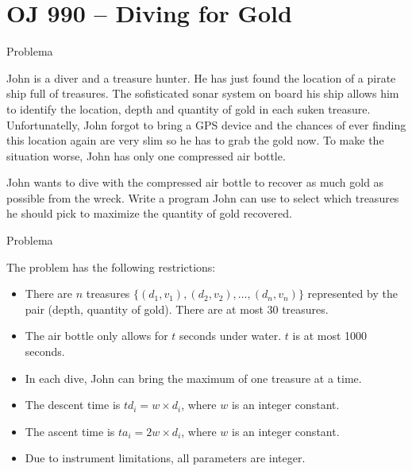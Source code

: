 \section{OJ 990 -- Diving for Gold}

\begin{frame}[fragile]{Problema}

John is a diver and a treasure hunter. He has just found the location of a pirate ship full of 
treasures.  The sofisticated sonar system on board his ship allows him to identify the 
location, depth and quantity of gold in each suken treasure. Unfortunatelly, John forgot to 
bring a GPS device and the chances of ever finding this location again are very slim so he has 
to grab the gold now. To make the situation worse, John has only one compressed air bottle.

John wants to dive with the compressed air bottle to recover as much gold as possible from the
wreck. Write a program John can use to select which treasures he should pick to maximize the 
quantity of gold recovered.

\end{frame}

\begin{frame}[fragile]{Problema}

    The problem has the following restrictions: 

    \begin{itemize}
        \item There are $n$ treasures $\{(d_1, v_1),(d_2, v_2), \ldots, (d_n, v_n)\}$
            represented by the pair (depth, quantity of gold). There are at most 30 treasures.

        \item The air bottle only allows for $t$ seconds under water. $t$ is at most 1000 
            seconds.

        \item In each dive, John can bring the maximum of one treasure at a time.

        \item The descent time is $td_i = w \times d_i$, where $w$ is an integer constant.

        \item The ascent time is $ta_i = 2w \times d_i$, where $w$ is an integer constant.

        \item Due to instrument limitations, all parameters are integer.
    \end{itemize}

\end{frame}

